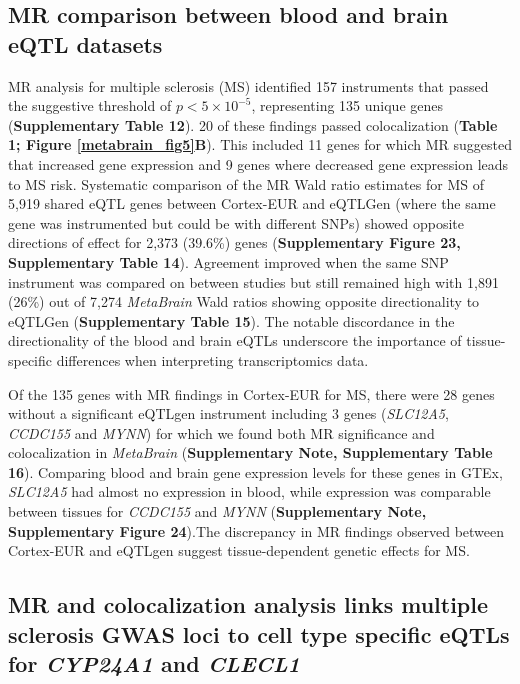 \subsection{MR comparison between blood and brain eQTL datasets}
MR analysis for multiple sclerosis (MS) identified 157 instruments that passed the suggestive threshold of $p<5 \times 10^{-5}$, representing 135 unique genes (\textbf{Supplementary Table 12}). 20 of these findings passed colocalization (\textbf{Table 1; Figure \ref{metabrain_fig5}B}). This included 11 genes for which MR suggested that increased gene expression and 9 genes where decreased gene expression leads to MS risk. Systematic comparison of the MR Wald ratio estimates for MS of 5,919 shared eQTL genes between Cortex-EUR and eQTLGen\cite{vosaUnravelingPolygenicArchitecture2018} (where the same gene was instrumented but could be with different SNPs) showed opposite directions of effect for 2,373 (39.6\%) genes (\textbf{Supplementary Figure 23, Supplementary Table 14}).  Agreement improved when the same SNP instrument was compared on between studies but still remained high with 1,891 (26\%) out of 7,274 \textit{MetaBrain} Wald ratios showing opposite directionality to eQTLGen (\textbf{Supplementary Table 15}). The notable discordance in the directionality of the blood and brain eQTLs underscore the importance of tissue-specific differences when interpreting transcriptomics data. 

Of the 135 genes with MR findings in Cortex-EUR for MS, there were 28 genes without a significant eQTLgen instrument including 3 genes (\textit{SLC12A5}, \textit{CCDC155} and \textit{MYNN}) for which we found both MR significance and colocalization in \textit{MetaBrain} (\textbf{Supplementary Note, Supplementary Table 16}). Comparing blood and brain gene expression levels for these genes in GTEx, \textit{SLC12A5} had almost no expression in blood, while expression was comparable between tissues for \textit{CCDC155} and \textit{MYNN} (\textbf{Supplementary Note, Supplementary Figure 24}).The discrepancy in MR findings observed between Cortex-EUR and eQTLgen suggest tissue-dependent genetic effects for MS. 

\subsection{MR and colocalization analysis links multiple sclerosis GWAS loci to cell type specific eQTLs for \textit{CYP24A1} and \textit{CLECL1} }

